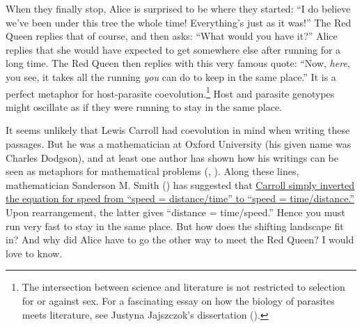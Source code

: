 \documentclass[
  letterpaper,
]{book}
\begin{document}
When they finally stop, Alice is surprised to be where they started: ``I
do believe we've been under this tree the whole time! Everything's just
as it was!'' The Red Queen replies that of course, and then asks: ``What
would you have it?'' Alice replies that she would have expected to get
somewhere else after running for a long time. The Red Queen then replies
with this very famous quote: ``Now, \emph{here}, you see, it takes all
the running \emph{you} can do to keep in the same place.'' It is a
perfect metaphor for host-parasite coevolution.\footnote{The
  intersection between science and literature is not restricted to
  selection for or against sex. For a fascinating essay on how the
  biology of parasites meets literature, see Justyna Jajszczok's
  dissertation ().} Host and parasite
genotypes might oscillate as if they were running to stay in the same
place.

It seems unlikely that Lewis Carroll had coevolution in mind when
writing these passages. But he was a mathematician at Oxford University
(his given name was Charles Dodgson), and at least one author has shown
how his writings can be seen as metaphors for mathematical problems
(,
). Along these lines, mathematician
Sanderson M. Smith () has suggested that
\href{http://www.herkimershideaway.org/writings/carroll.htm}{Carroll
simply inverted the equation for speed from ``speed = distance/time'' to
``speed = time/distance.''} Upon rearrangement, the latter gives
``distance = time/speed.'' Hence you must run very fast to stay in the
same place. But how does the shifting landscape fit in? And why did
Alice have to go the other way to meet the Red Queen? I would love to
know.
\end{document}
